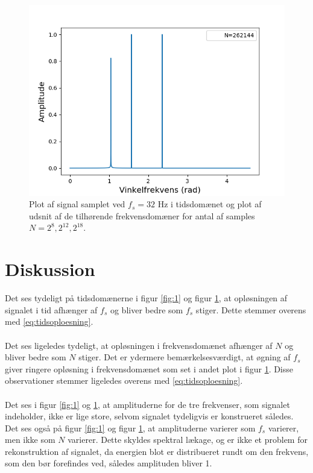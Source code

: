 \begin{figure}[H]
\begin{minipage}{0.49\textwidth}
\includegraphics[width=\textwidth]{figures/frekvensanalyse/32hz_freq3.png}
\end{minipage}
\caption{Plot af signal samplet ved $f_s=32$ Hz i tidsdomænet og plot af udsnit af de tilhørende frekvensdomæner for antal af samples $N=2^8, 2^{12}, 2^{18}$.}
\label{fig:2}
\end{figure}

\section{Diskussion}
Det ses tydeligt på tidsdomænerne i figur \ref{fig:1} og figur \ref{fig:2}, at opløsningen af signalet i tid afhænger af $f_s$ og bliver bedre som $f_s$ stiger. Dette stemmer overens med \eqref{eq:tidsoploesning}.
\\ \\
Det ses ligeledes tydeligt, at opløsningen i frekvensdomænet afhænger af $N$ og bliver bedre som $N$ stiger. Det er ydermere bemærkelsesværdigt, at øgning af $f_s$ giver ringere opløsning i frekvensdomænet som set i andet plot i figur \ref{fig:2}. Disse observationer stemmer ligeledes overens med \eqref{eq:tidsoploesning}.
\\ \\
Det ses i figur \ref{fig:1} og \ref{fig:2}, at amplituderne for de tre frekvenser, som signalet indeholder, ikke er lige store, selvom signalet tydeligvis er konstrueret således. Det ses også på figur \ref{fig:1} og figur \ref{fig:2}, at amplituderne varierer som $f_s$ varierer, men ikke som $N$ varierer. Dette skyldes spektral lækage, og er ikke et problem for rekonstruktion af signalet, da energien blot er distribueret rundt om den frekvens, som den bør forefindes ved, således amplituden bliver 1.

